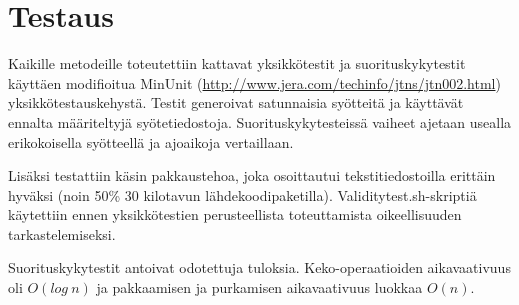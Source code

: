 \documentclass[a4paper, 12pt, finnish]{article}
\begin{document}
\section{Testaus}
Kaikille metodeille toteutettiin kattavat yksikkötestit ja suorituskykytestit käyttäen modifioitua MinUnit (\url{http://www.jera.com/techinfo/jtns/jtn002.html}) yksikkötestauskehystä. Testit generoivat satunnaisia syötteitä ja käyttävät ennalta määriteltyjä syötetiedostoja. Suorituskykytesteissä vaiheet ajetaan usealla erikokoisella syötteellä ja ajoaikoja vertaillaan.

Lisäksi testattiin käsin pakkaustehoa, joka osoittautui tekstitiedostoilla erittäin hyväksi (noin 50\% 30 kilotavun lähdekoodipaketilla). Validitytest.sh-skriptiä käytettiin ennen yksikkötestien perusteellista toteuttamista oikeellisuuden tarkastelemiseksi.

Suorituskykytestit antoivat odotettuja tuloksia. Keko-operaatioiden aikavaativuus oli $O(log~n)$ ja pakkaamisen ja purkamisen aikavaativuus luokkaa $O(n)$.
\end{document}
